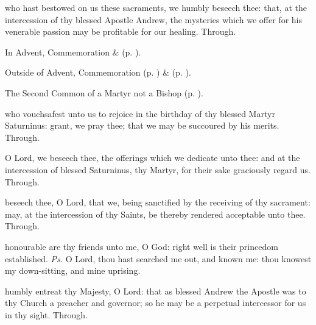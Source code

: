 
\postcommunion
{} who hast bestowed on us these sacraments, we humbly beseech thee: that, at the intercession of thy blessed Apostle Andrew, the mysteries which we offer for his venerable passion may be profitable for our healing. Through.

\begin{rubric}
	In Advent, Commemoration  \&  (p. \pageref{SaturninusPostcommunion}).
\end{rubric}
\begin{rubric}
	Outside of Advent, Commemoration  (p. \pageref{SaturninusPostcommunion}) \&  (p. \pageref{SPMaryInEaster}).
\end{rubric}



\begin{rubric}
	The Second Common of a Martyr not a Bishop (p. \pageref{CommonMartyrNotBishopII}).
\end{rubric}

\collect\label{SaturninusCollect}
 who vouchsafest unto us to rejoice in the birthday of thy blessed Martyr Saturninus: grant, we pray thee; that we may be succoured by his merits. Through.

\secret\label{SaturninusSecret}
 O Lord, we beseech thee, the offerings which we dedicate unto thee: and at the intercession of blessed Saturninus, thy Martyr, for their sake graciously regard us. Through.

\postcommunion\label{SaturninusPostcommunion}
 beseech thee, O Lord, that we, being sanctified by the receiving of thy sacrament: may, at the intercession of thy Saints, be thereby rendered acceptable unto thee. Through.



\introit
{} honourable are thy friends unto me, O God: right well is their princedom established. \textit{Ps.} O Lord, thou hast searched me out, and known me: thou knowest my down-sitting, and mine uprising.

\collect
{} humbly entreat thy Majesty, O Lord: that as blessed Andrew the Apostle was to thy Church a preacher and governor; so he may be a perpetual intercessor for us in thy sight. Through.

